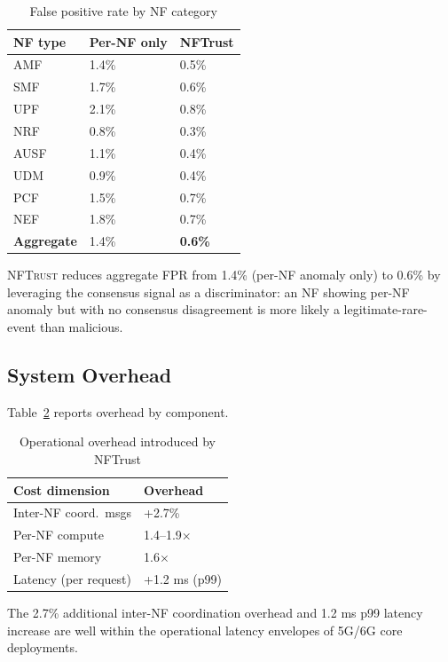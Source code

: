\documentclass[sigconf,nonacm]{acmart}
\begin{document}
\begin{table}[h]
\caption{False positive rate by NF category}
\label{tab:fpr}
\small
\begin{tabularx}{\columnwidth}{@{}p{2.0cm}X X@{}}
\toprule
\textbf{NF type} & \textbf{Per-NF only} & \textbf{NFTrust} \\
\midrule
AMF       & 1.4\%  & 0.5\% \\
SMF       & 1.7\%  & 0.6\% \\
UPF       & 2.1\%  & 0.8\% \\
NRF       & 0.8\%  & 0.3\% \\
AUSF      & 1.1\%  & 0.4\% \\
UDM       & 0.9\%  & 0.4\% \\
PCF       & 1.5\%  & 0.7\% \\
NEF       & 1.8\%  & 0.7\% \\
\midrule
\textbf{Aggregate} & 1.4\% & \textbf{0.6\%} \\
\bottomrule
\end{tabularx}
\end{table}

\textsc{NFTrust} reduces aggregate FPR from 1.4\% (per-NF anomaly
only) to 0.6\% by leveraging the consensus signal as a
discriminator: an NF showing per-NF anomaly but with no consensus
disagreement is more likely a legitimate-rare-event than malicious.

\subsection{System Overhead}

Table~\ref{tab:overhead} reports overhead by component.

\begin{table}[h]
\caption{Operational overhead introduced by NFTrust}
\label{tab:overhead}
\small
\begin{tabularx}{\columnwidth}{@{}p{3.0cm}X@{}}
\toprule
\textbf{Cost dimension} & \textbf{Overhead} \\
\midrule
Inter-NF coord.\ msgs    & +2.7\% \\
Per-NF compute           & 1.4--1.9$\times$ \\
Per-NF memory            & 1.6$\times$ \\
Latency (per request)    & +1.2 ms (p99) \\
\bottomrule
\end{tabularx}
\end{table}

The 2.7\% additional inter-NF coordination overhead and 1.2 ms p99
latency increase are well within the operational latency envelopes
of 5G/6G core deployments.
\end{document}
